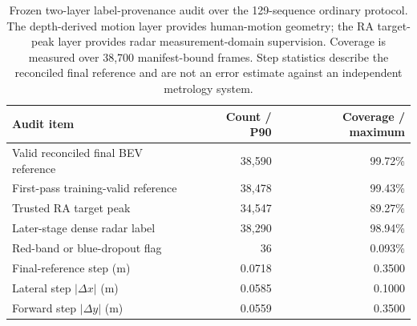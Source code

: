 \begin{table}[t]
\centering
\caption{Frozen two-layer label-provenance audit over the 129-sequence ordinary protocol. The depth-derived motion layer provides human-motion geometry; the RA target-peak layer provides radar measurement-domain supervision. Coverage is measured over 38,700 manifest-bound frames. Step statistics describe the reconciled final reference and are not an error estimate against an independent metrology system.}
\label{tab:reference-provenance}
\footnotesize
\setlength{\tabcolsep}{3.5pt}
\begin{tabular}{lrr}
\toprule
Audit item & Count / P90 & Coverage / maximum \\
\midrule
Valid reconciled final BEV reference & 38,590 & 99.72\% \\
First-pass training-valid reference & 38,478 & 99.43\% \\
Trusted RA target peak & 34,547 & 89.27\% \\
Later-stage dense radar label & 38,290 & 98.94\% \\
Red-band or blue-dropout flag & 36 & 0.093\% \\
Final-reference step (m) & 0.0718 & 0.3500 \\
Lateral step $|\Delta x|$ (m) & 0.0585 & 0.1000 \\
Forward step $|\Delta y|$ (m) & 0.0559 & 0.3500 \\
\bottomrule
\end{tabular}
\end{table}
